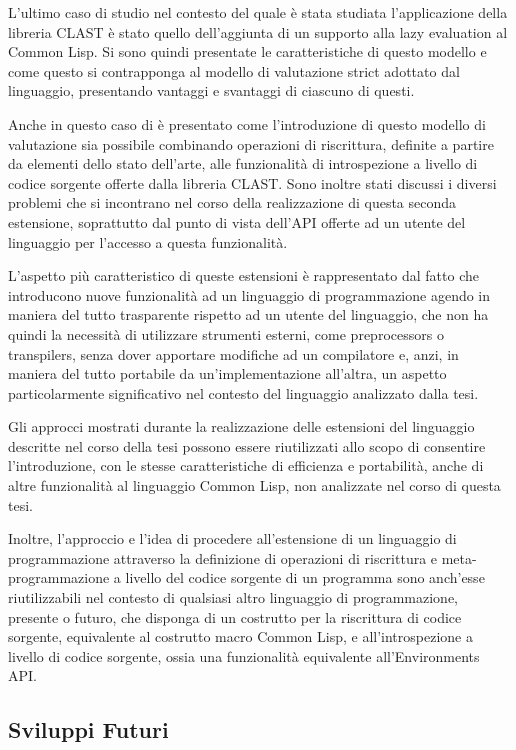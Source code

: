 \documentclass{book}
\begin{document}
L'ultimo caso di studio nel contesto del quale è stata studiata l'applicazione
della libreria CLAST è stato quello dell'aggiunta di un supporto alla lazy
evaluation al Common Lisp. Si sono quindi presentate le caratteristiche di
questo modello e come questo si contrapponga al modello di valutazione strict
adottato dal linguaggio, presentando vantaggi e svantaggi di ciascuno di questi.

Anche in questo caso di è presentato come l'introduzione di questo modello di
valutazione sia possibile combinando operazioni di riscrittura, definite a
partire da elementi dello stato dell'arte, alle funzionalità di introspezione a
livello di codice sorgente offerte dalla libreria CLAST. Sono inoltre stati
discussi i diversi problemi che si incontrano nel corso della realizzazione di
questa seconda estensione, soprattutto dal punto di vista dell'API offerte ad un
utente del linguaggio per l'accesso a questa funzionalità.

L'aspetto più caratteristico di queste estensioni è rappresentato dal fatto che
introducono nuove funzionalità ad un linguaggio di programmazione agendo in
maniera del tutto trasparente rispetto ad un utente del linguaggio, che non ha
quindi la necessità di utilizzare strumenti esterni, come preprocessors o
transpilers, senza dover apportare modifiche ad un compilatore e, anzi, in
maniera del tutto portabile da un'implementazione all'altra, un aspetto
particolarmente significativo nel contesto del linguaggio analizzato dalla tesi.

Gli approcci mostrati durante la realizzazione delle estensioni del linguaggio
descritte nel corso della tesi possono essere riutilizzati allo scopo di
consentire l'introduzione, con le stesse caratteristiche di efficienza e
portabilità, anche di altre funzionalità al linguaggio Common Lisp, non
analizzate nel corso di questa tesi.

Inoltre, l'approccio e l'idea di procedere all'estensione di un linguaggio di
programmazione attraverso la definizione di operazioni di riscrittura e
meta-programmazione a livello del codice sorgente di un programma sono anch'esse
riutilizzabili nel contesto di qualsiasi altro linguaggio di programmazione,
presente o futuro, che disponga di un costrutto per la riscrittura di codice
sorgente, equivalente al costrutto macro Common Lisp, e all'introspezione a
livello di codice sorgente, ossia una funzionalità equivalente all'Environments
API.

\subsection{Sviluppi Futuri}
\end{document}
